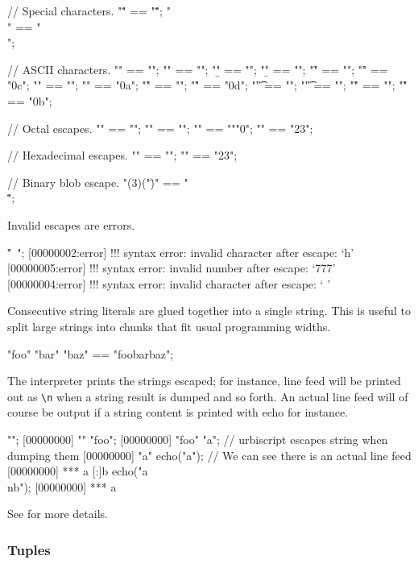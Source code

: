 \begin{urbiassert}
// Special characters.
"\"" == "\"";
"\\" == "\\";

// ASCII characters.
"\a" == ""; "\a" == "";
"\b" == ""; "\b" == "";
"\f" == ""; "\f" == "\x0c";
"\n" == ""; "\n" == "\x0a";
"\r" == ""; "\r" == "\x0d";
"\t" == ""; "\t" == "";
"\v" == ""; "\v" == "\x0b";

// Octal escapes.
"\0" == ""; "\0" == "";
"" == "\0""0";
"" == "23";

// Hexadecimal escapes.
"" == "\0";
"" == "23";

// Binary blob escape.
"\B(3)("\")" == "\"\\\"";
\end{urbiassert}

Invalid escapes are errors.

\begin{urbiscript}
"\h{}\ ";
[00000002:error] !!! syntax error: invalid character after \-escape: `h'
[00000005:error] !!! syntax error: invalid number after \-escape: `777'
[00000004:error] !!! syntax error: invalid character after \-escape: ` '
\end{urbiscript}

Consecutive string literals are glued together into a single string.  This
is useful to split large strings into chunks that fit usual programming
widths.

\begin{urbiassert}
"foo" "bar" "baz" == "foobarbaz";
\end{urbiassert}

The interpreter prints the strings escaped; for instance, line feed will be
printed out as \lstinline|\n| when a string result is dumped and so
forth. An actual line feed will of course be output if a string content is
printed with echo for instance.

\begin{urbiscript}
"";
[00000000] ""
"foo";
[00000000] "foo"
"a\nb"; // urbiscript escapes string when dumping them
[00000000] "a\nb"
echo("a\nb"); // We can see there is an actual line feed
[00000000] *** a
[:]b
echo("a\\nb");
[00000000] *** a\nb
\end{urbiscript}

See  for more details.

\subsubsection{Tuples}
\label{sec:lang:tuples}

